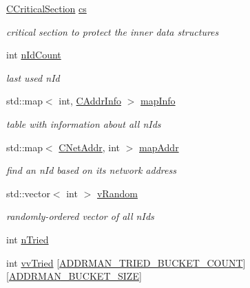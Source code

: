 \begin{DoxyCompactItemize}
\item 
\mbox{\hyperlink{sync_8h_a37a4692b2d517f2843655ca11af7668a}{C\+Critical\+Section}} \mbox{\hyperlink{class_c_addr_man_aa4519d05a02e493046e5ece1ce87c084}{cs}}
\begin{DoxyCompactList}\small\item\em critical section to protect the inner data structures \end{DoxyCompactList}\item 
int \mbox{\hyperlink{class_c_addr_man_a77ff8bd51009324f2be012bd759b37d0}{n\+Id\+Count}}
\begin{DoxyCompactList}\small\item\em last used n\+Id \end{DoxyCompactList}\item 
std\+::map$<$ int, \mbox{\hyperlink{class_c_addr_info}{C\+Addr\+Info}} $>$ \mbox{\hyperlink{class_c_addr_man_a1232db343240bf03c45eaea7bcec550b}{map\+Info}}
\begin{DoxyCompactList}\small\item\em table with information about all n\+Ids \end{DoxyCompactList}\item 
std\+::map$<$ \mbox{\hyperlink{class_c_net_addr}{C\+Net\+Addr}}, int $>$ \mbox{\hyperlink{class_c_addr_man_a5c387857d8553818a56a4faac33fb691}{map\+Addr}}
\begin{DoxyCompactList}\small\item\em find an n\+Id based on its network address \end{DoxyCompactList}\item 
std\+::vector$<$ int $>$ \mbox{\hyperlink{class_c_addr_man_af9c2199d29d7a1a7c6c5c1e3abec4102}{v\+Random}}
\begin{DoxyCompactList}\small\item\em randomly-\/ordered vector of all n\+Ids \end{DoxyCompactList}\item 
int \mbox{\hyperlink{class_c_addr_man_ae8566be810e6429012f1c2c1609b4540}{n\+Tried}}
\item 
int \mbox{\hyperlink{class_c_addr_man_a3d0e798757be2620f76a5ee02d3b321e}{vv\+Tried}} \mbox{[}\mbox{\hyperlink{addrman_8h_ab09df186aa818ce7b9e7c86446511cf1}{A\+D\+D\+R\+M\+A\+N\+\_\+\+T\+R\+I\+E\+D\+\_\+\+B\+U\+C\+K\+E\+T\+\_\+\+C\+O\+U\+NT}}\mbox{]}\mbox{[}\mbox{\hyperlink{addrman_8h_a3499731a6c89e164cf74b68be2be0a84}{A\+D\+D\+R\+M\+A\+N\+\_\+\+B\+U\+C\+K\+E\+T\+\_\+\+S\+I\+ZE}}\mbox{]}

\end{DoxyCompactItemize}
